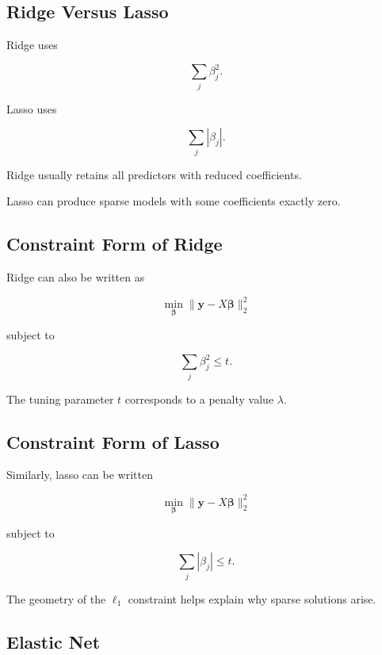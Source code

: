 \subsection{Ridge Versus Lasso}
\label{subsec:ridge-versus-lasso}

Ridge uses

\[
\boxed{
\sum_j\beta_j^2.
}
\]

Lasso uses

\[
\boxed{
\sum_j|\beta_j|.
}
\]

Ridge usually retains all predictors with reduced coefficients.

Lasso can produce sparse models with some coefficients exactly zero.

\subsection{Constraint Form of Ridge}
\label{subsec:ridge-constraint-form}

Ridge can also be written as

\[
\boxed{
\min_{\boldsymbol{\beta}}
\|
\mathbf{y}
-
X\boldsymbol{\beta}
\|_2^2
}
\]

subject to

\[
\boxed{
\sum_j
\beta_j^2
\leq
t.
}
\]

The tuning parameter \(t\) corresponds to a penalty value \(\lambda\).

\subsection{Constraint Form of Lasso}
\label{subsec:lasso-constraint-form}

Similarly, lasso can be written

\[
\boxed{
\min_{\boldsymbol{\beta}}
\|
\mathbf{y}
-
X\boldsymbol{\beta}
\|_2^2
}
\]

subject to

\[
\boxed{
\sum_j
|\beta_j|
\leq
t.
}
\]

The geometry of the \(\ell_1\) constraint helps explain why sparse
solutions arise.

\subsection{Elastic Net}
\label{subsec:elastic-net}

